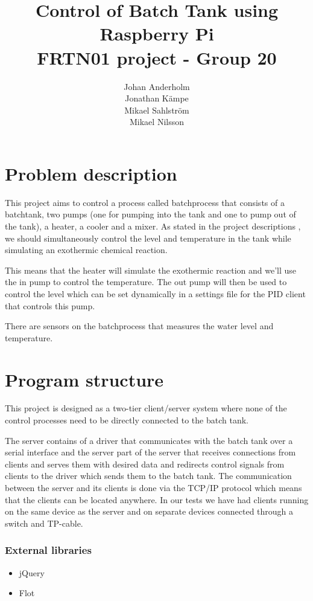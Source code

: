 \documentclass{article}
\title{Control of Batch Tank using Raspberry Pi \\ FRTN01 project - Group 20}
\date{}
\author{Johan Anderholm \\ Jonathan Kämpe \\ Mikael Sahlström \\ Mikael Nilsson}
\begin{document}
\maketitle
\newpage
\tableofcontents
\newpage
\section{Problem description}
This project aims to control a process called batchprocess that consists of a
batchtank, two pumps (one for pumping into the tank and one to pump out of the
tank), a heater, a cooler and a mixer. As stated in the project descriptions
\cite[p.~6]{project12}, we should simultaneously control the level and
temperature in the tank while simulating an exothermic chemical reaction.

This means that the heater will simulate the exothermic reaction and we'll use
the in pump to control the temperature. The out pump will then be used
to control the level which can be set dynamically in a settings file for the PID client that controls this pump.

There are sensors on the batchprocess that measures the water level and temperature.

\section{Program structure}
This project is designed as a two-tier client/server system 
\cite[p.~6]{clientserver} where none of the control processes need to be directly
connected to the batch tank.

The server contains of a driver that communicates with the batch tank over a
serial interface and the server part of the server that receives connections from
clients and serves them with desired data and redirects control signals from
clients to the driver which sends them to the batch tank. The communication
between the server and its clients is done via the TCP/IP protocol which means
that the clients can be located anywhere. In our tests we have had clients
running on the same device as the server and on separate devices connected
through a switch and TP-cable.

\subsubsection{External libraries}
\begin{itemize}
\item{jQuery}
\item{Flot}
\end{itemize}
\end{document}
